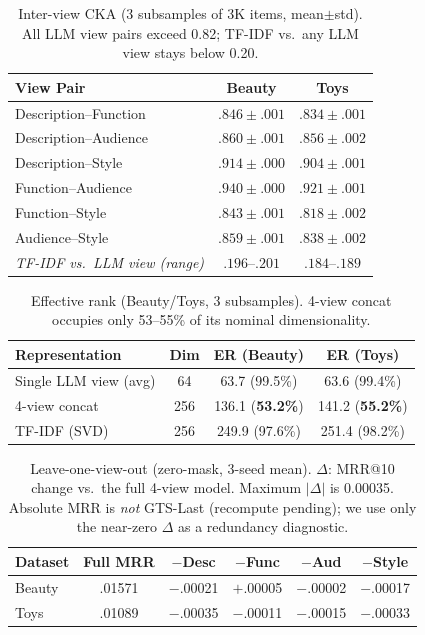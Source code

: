 \documentclass[sigconf,natbib=true,anonymous]{acmart}
\begin{document}
\begin{table}[t]
\centering
\caption{%
Inter-view CKA (3 subsamples of 3K items, mean$\pm$std).
All LLM view pairs exceed 0.82; TF-IDF vs.\ any LLM view stays below 0.20.%
}
\label{tab:cka}
\small
\setlength{\tabcolsep}{4pt}
\begin{tabular}{@{}lcc@{}}
\toprule
View Pair & Beauty & Toys \\
\midrule
Description--Function  & $.846 \pm .001$ & $.834 \pm .001$ \\
Description--Audience  & $.860 \pm .001$ & $.856 \pm .002$ \\
Description--Style     & $.914 \pm .000$ & $.904 \pm .001$ \\
Function--Audience     & $.940 \pm .000$ & $.921 \pm .001$ \\
Function--Style        & $.843 \pm .001$ & $.818 \pm .002$ \\
Audience--Style        & $.859 \pm .001$ & $.838 \pm .002$ \\
\midrule
\emph{TF-IDF vs.\ LLM view (range)} & $.196$--$.201$ & $.184$--$.189$ \\
\bottomrule
\end{tabular}
\end{table}

\begin{table}[t]
\centering
\caption{%
Effective rank (Beauty/Toys, 3 subsamples).
4-view concat occupies only 53--55\% of its nominal dimensionality.%
}
\label{tab:effrank}
\small
\begin{tabular}{@{}lccc@{}}
\toprule
Representation & Dim & ER (Beauty) & ER (Toys) \\
\midrule
Single LLM view (avg) & 64 & 63.7 (99.5\%) & 63.6 (99.4\%) \\
4-view concat & 256 & 136.1 (\textbf{53.2\%}) & 141.2 (\textbf{55.2\%}) \\
TF-IDF (SVD) & 256 & 249.9 (97.6\%) & 251.4 (98.2\%) \\
\bottomrule
\end{tabular}
\end{table}

\begin{table}[t]
\centering
\caption{%
Leave-one-view-out (zero-mask, 3-seed mean).
$\Delta$: MRR@10 change vs.\ the full 4-view model.
Maximum $|\Delta|$ is 0.00035.
Absolute MRR is \emph{not} GTS-Last (recompute pending); we use only the near-zero $\Delta$ as a redundancy diagnostic.%
}
\label{tab:loov}
\small
\setlength{\tabcolsep}{3.5pt}
\begin{tabular}{@{}lccccc@{}}
\toprule
Dataset & Full MRR & $-$Desc & $-$Func & $-$Aud & $-$Style \\
\midrule
Beauty & .01571 & $-$.00021 & $+$.00005 & $-$.00002 & $-$.00017 \\
Toys   & .01089 & $-$.00035 & $-$.00011 & $-$.00015 & $-$.00033 \\
\bottomrule
\end{tabular}
\end{table}
\end{document}
